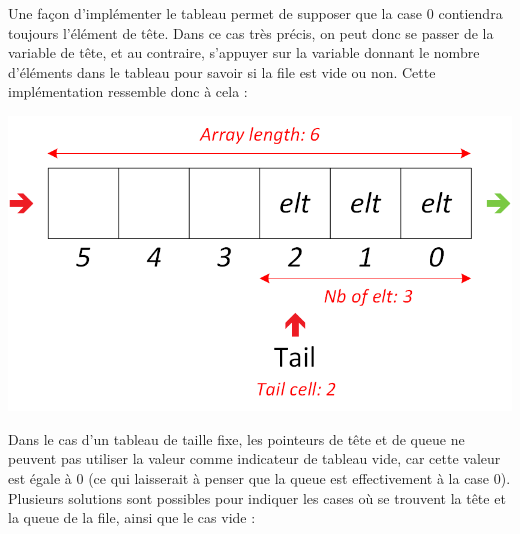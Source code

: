 \smallskip

Une façon d'implémenter le tableau permet de supposer que la case $ 0 $ contiendra toujours l'élément de tête.
Dans ce cas très précis, on peut donc se passer de la variable de tête, et au contraire, s'appuyer sur la variable donnant le nombre d'éléments dans le tableau pour savoir si la file est vide ou non.
Cette implémentation ressemble donc à cela :\\

\begin{center}
\includegraphics[scale=1]{Cours/Files_5_Tableau_Statique_Structure_Detaillee_2.png}
\end{center}

\smallskip

Dans le cas d'un tableau de taille fixe, les pointeurs de tête et de queue ne peuvent pas utiliser la valeur  comme indicateur de tableau vide, car cette valeur est égale à $ 0 $ (ce qui laisserait à penser que la queue est effectivement à la case 0).
Plusieurs solutions sont possibles pour indiquer les cases où se trouvent la tête et la queue de la file, ainsi que le cas vide :


